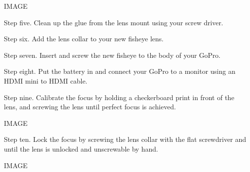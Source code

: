 \begin{fullwidth}
IMAGE

Step five. Clean up the glue from the lens mount using your screw driver.

Step six. Add the lens collar to your new fisheye lens.

Step seven. Insert and screw the new fisheye to the body of your GoPro.

Step eight. Put the battery in and connect your GoPro to a monitor using an HDMI mini to HDMI cable.

Step nine. Calibrate the focus by holding a checkerboard print in front of the lens, and screwing the lens until perfect focus is achieved. 

IMAGE

Step ten. Lock the focus by screwing the lens collar with the flat screwdriver and until the lens is unlocked and unscrewable by hand.

IMAGE


\clearpage
\end{fullwidth}
